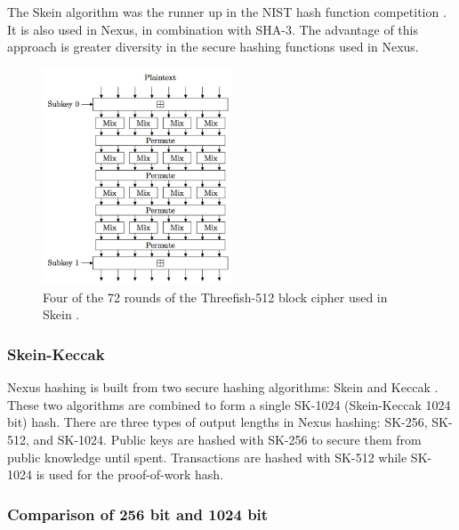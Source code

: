 \documentclass[11pt]{article}
\begin{document}
The Skein algorithm was the runner up in the NIST hash function competition \cite{wikiskein}.
It is also used in Nexus, in combination with SHA-3.
The advantage of this approach is greater diversity in the secure hashing functions used in Nexus.

\begin{figure} %
    \caption{Four of the 72 rounds of the Threefish-512 block cipher used in Skein \cite{skeinpaper}.}
    \centering
    \includegraphics[width=0.50\textwidth]{skein-threefish-512-part.jpg}
\end{figure}

\pagebreak
\subsubsection{Skein-Keccak}

Nexus hashing is built from two secure hashing algorithms: Skein and Keccak \cite{sha3announce}. 
These two algorithms are combined to form a single SK-1024 (Skein-Keccak 1024 bit) hash. 
There are three types of output lengths in Nexus hashing: SK-256, SK-512, and SK-1024.
Public keys are hashed with SK-256 to secure them from public knowledge until spent. 
Transactions are hashed with SK-512 while SK-1024 is used for the proof-of-work hash.


\subsubsection{Comparison of 256 bit and 1024 bit}
\end{document}
